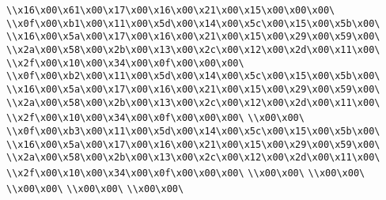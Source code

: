 \verb|\\x16\x00\x61\x00\x17\x00\x16\x00\x21\x00\x15\x00\x00\x00\|\newline
\verb|\\x0f\x00\xb1\x00\x11\x00\x5d\x00\x14\x00\x5c\x00\x15\x00\x5b\x00\|\newline
\verb|\\x16\x00\x5a\x00\x17\x00\x16\x00\x21\x00\x15\x00\x29\x00\x59\x00\|\newline
\verb|\\x2a\x00\x58\x00\x2b\x00\x13\x00\x2c\x00\x12\x00\x2d\x00\x11\x00\|\newline
\verb|\\x2f\x00\x10\x00\x34\x00\x0f\x00\x00\x00\|\newline
\verb|\\x0f\x00\xb2\x00\x11\x00\x5d\x00\x14\x00\x5c\x00\x15\x00\x5b\x00\|\newline
\verb|\\x16\x00\x5a\x00\x17\x00\x16\x00\x21\x00\x15\x00\x29\x00\x59\x00\|\newline
\verb|\\x2a\x00\x58\x00\x2b\x00\x13\x00\x2c\x00\x12\x00\x2d\x00\x11\x00\|\newline
\verb|\\x2f\x00\x10\x00\x34\x00\x0f\x00\x00\x00\|\newline
\verb|\\x00\x00\|\newline
\verb|\\x0f\x00\xb3\x00\x11\x00\x5d\x00\x14\x00\x5c\x00\x15\x00\x5b\x00\|\newline
\verb|\\x16\x00\x5a\x00\x17\x00\x16\x00\x21\x00\x15\x00\x29\x00\x59\x00\|\newline
\verb|\\x2a\x00\x58\x00\x2b\x00\x13\x00\x2c\x00\x12\x00\x2d\x00\x11\x00\|\newline
\verb|\\x2f\x00\x10\x00\x34\x00\x0f\x00\x00\x00\|\newline
\verb|\\x00\x00\|\newline
\verb|\\x00\x00\|\newline
\verb|\\x00\x00\|\newline
\verb|\\x00\x00\|\newline
\verb|\\x00\x00\|\newline
